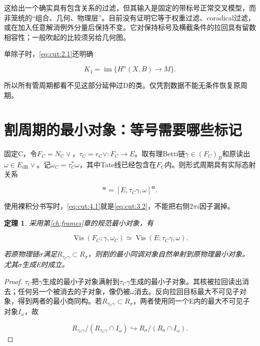 \documentclass[11pt,a4paper,oneside]{ctexrep}
\theoremstyle{cnplain}
\newtheorem{theorem}{定理}[chapter]
\theoremstyle{definition}
\theoremstyle{remark}
\begin{document}
这给出一个确实具有包含关系的过滤，但其输入是固定的带标号正常交叉模型，而非笼统的``组合、几何、物理层''。目前没有证明它等于权重过滤、coradical过滤，或在加入任意解消例外分量后保持不变。它对保持标号及横截条件的拉回具有留数相容性；一般吹起的比较须另给几何图。

单除子时，\eqref{eq:cut:2.1}还明确

\begin{equation}
K_1=\operatorname{im}\{H^n(X,B)\to M\}.              \label{eq:cut:3.5}
\end{equation}

所以所有管周期都看不见这部分延伸过D的类。仅凭割数据不能无条件恢复原周期。

\section{割周期的最小对象：等号需要哪些标记}\label{sec:cut:4}

固定C，令\(F_C=N_C\vee \)，\(\tau _C=r_C\vee :F_C\to E\)。取有理Betti链\(\gamma \in (F_C)_B\)和原读出\(\omega \in E_{\mathrm{dR}}\vee \)。记\(\omega _C=\tau _C^\ast \omega \)，其中Tate线已经包含在\(F_C\)内。则形式周期具有实际态射关系

\begin{equation}
[F_C,\gamma,\omega_C]^{\mathfrak m}
       =[E,\tau_C\gamma,\omega]^{\mathfrak m}.         \label{eq:cut:4.1}
\end{equation}

使用裸积分书写时，\eqref{eq:cut:4.1}就是\eqref{eq:cut:3.2}，不能把右侧\(2\pi i\)因子漏掉。

\begin{theorem}

\label{thm:cut:4.1} 采用第\ref{ch:frames}章的规范最小对象，有

\begin{equation}
\operatorname{Vis}(F_C;\gamma,\omega_C)
     \simeq\operatorname{Vis}(E;\tau_C\gamma,\omega).  \label{eq:cut:4.2}
\end{equation}

若原物理链\(\sigma \)满足\(R_{\tau _C\gamma }\subset R_\sigma \)，则割的最小同调对象自然单射到原物理最小对象。尤其\(\sigma \)生成E时成立。

\end{theorem}

\begin{proof}

\(\tau _C\)把\(\gamma \)生成的最小子对象满射到\(\tau _C\gamma \)生成的最小子对象。其核被拉回读出消去；任何另一个被消去的子对象，像仍被\(\omega \)消去。反向拉回目标最大不可见子对象，得到两者的最小商同构。若\(R_{\tau _C\gamma }\subset R_\sigma \)，两者使用同一个E内的最大不可见子对象\(I_\omega \)，故

\begin{equation}
R_{\tau _C\gamma }/(R_{\tau _C\gamma }\cap I_\omega)
       \hookrightarrow R_\sigma/(R_\sigma\cap I_\omega).
\end{equation}

\end{proof}
\end{document}
